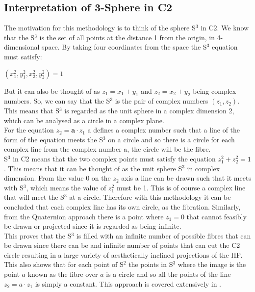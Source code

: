 \documentclass[12pt]{article} %
\begin{document}
\begin{flushleft}
\subsection{Interpretation of 3-Sphere in C2} %
The motivation for this methodology is to think of the sphere S$^{3}$ in C2. We know that the S$^{3}$ is the set of all points at the distance 1 from the origin, in 4-dimensional space. By taking four coordinates from the space the S$^{3}$ equation must satisfy:
\begin{center}$(x_{1}^{2}, y_{1}^{2}, x_{2}^{2}, y_{2}^{2}) = 1$\end{center}

But it can also be thought of as $z_{1} = x_{1} + y_{1}$ and $z_{2} = x_{2} + y_{2}$ being complex numbers. So, we can say that the S$^{3}$ is the pair of complex numbers $(z_{1}, z_{2})$. This means that S$^{3}$ is regarded as the unit sphere in a complex dimension 2, which can be analysed as a circle in a complex plane.\\
For the equation $z_{2} = \textbf{a}\cdot z_{1}$ a defines a complex number such that a line of the form of the equation meets the S$^{3}$ on a circle and so there is a circle for each complex line from the complex number a, the circle will be the fibre.\\

S$^{3}$ in C2 means that the two complex points must satisfy the equation $z_{1}^{2} + z_{2}^{2} = 1$. This means that it can be thought of as the unit sphere S$^{3}$ in complex dimension. From the value 0 on the $z_{2}$ axis a line can be drawn such that it meets with S$^{3}$, which means the value of $z_{1}^{2}$ must be 1. This is of course a complex line that will meet the S$^{3}$ at a circle. Therefore with this methodology it can be concluded that each complex line has its own circle, as the fibration. Similarly, from the Quaternion approach there is a point where $z_{1} = 0$ that cannot feasibly be drawn or projected since it is regarded as being infinite.\\
This proves that the S$^{3}$ is filled with an infinite number of possible fibres that can be drawn since there can be and infinite number of points that can cut the C2 circle resulting in a large variety of aesthetically inclined projections of the HF.\\
This also shows that for each point of S$^{2}$ the points in S$^{3}$ where the image is the point $a$ known as the fibre over $a$ is a circle and so all the points of the line $z_{2} = a\cdot z_{1}$ is simply a constant.
This approach is covered extensively in \cite{Thurston}.
\newpage

\end{flushleft}
\end{document}
